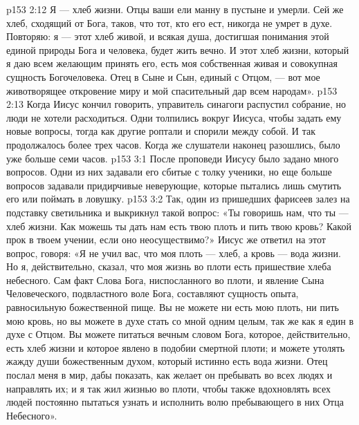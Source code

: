 \vs p153 2:12 Я --- хлеб жизни. Отцы ваши ели манну в пустыне и умерли. Сей же хлеб, сходящий от Бога, таков, что тот, кто его ест, никогда не умрет в духе. Повторяю: я --- этот хлеб живой, и всякая душа, достигшая понимания этой единой природы Бога и человека, будет жить вечно. И этот хлеб жизни, который я даю всем желающим принять его, есть моя собственная живая и совокупная сущность Богочеловека. Отец в Сыне и Сын, единый с Отцом, --- вот мое животворящее откровение миру и мой спасительный дар всем народам».
\vs p153 2:13 Когда Иисус кончил говорить, управитель синагоги распустил собрание, но люди не хотели расходиться. Одни толпились вокруг Иисуса, чтобы задать ему новые вопросы, тогда как другие роптали и спорили между собой. И так продолжалось более трех часов. Когда же слушатели наконец разошлись, было уже больше семи часов.
\vs p153 3:1 После проповеди Иисусу было задано много вопросов. Одни из них задавали его сбитые с толку ученики, но еще больше вопросов задавали придирчивые неверующие, которые пытались лишь смутить его или поймать в ловушку.
\vs p153 3:2 Так, один из пришедших фарисеев залез на подставку светильника и выкрикнул такой вопрос: «Ты говоришь нам, что ты --- хлеб жизни. Как можешь ты дать нам есть твою плоть и пить твою кровь? Какой прок в твоем учении, если оно неосуществимо?» Иисус же ответил на этот вопрос, говоря: «Я не учил вас, что моя плоть --- хлеб, а кровь --- вода жизни. Но я, действительно, сказал, что моя жизнь во плоти есть пришествие хлеба небесного. Сам факт Слова Бога, ниспосланного во плоти, и явление Сына Человеческого, подвластного воле Бога, составляют сущность опыта, равносильную божественной пище. Вы не можете ни есть мою плоть, ни пить мою кровь, но вы можете в духе стать со мной одним целым, так же как я един в духе с Отцом. Вы можете питаться вечным словом Бога, которое, действительно, есть хлеб жизни и которое явлено в подобии смертной плоти; и можете утолять жажду души божественным духом, который истинно есть вода жизни. Отец послал меня в мир, дабы показать, как желает он пребывать во всех людях и направлять их; и я так жил жизнью во плоти, чтобы также вдохновлять всех людей постоянно пытаться узнать и исполнить волю пребывающего в них Отца Небесного».
